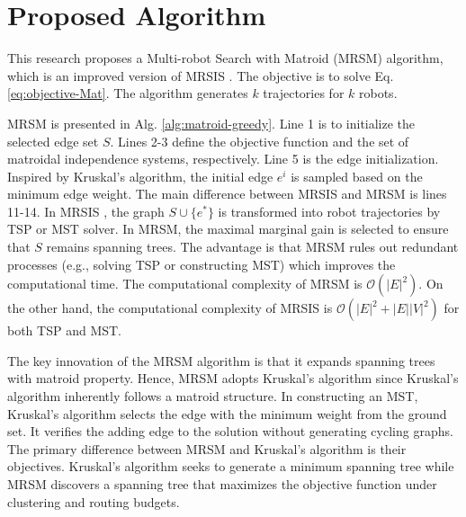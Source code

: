 \chapter{Proposed Algorithm}
This research proposes a Multi-robot Search with Matroid (MRSM) algorithm, which is an improved version of MRSIS \cite{li2024mrsis}.
The objective is to solve Eq. \eqref{eq:objective-Mat}. The algorithm generates $k$ trajectories for $k$ robots.

MRSM is presented in Alg. \ref{alg:matroid-greedy}.
Line 1 is to initialize the selected edge set $S$.
Lines 2-3 define the objective function and the set of matroidal independence systems, respectively.
Line 5 is the edge initialization. Inspired by Kruskal's algorithm, the initial edge $e^i$ is sampled based on the minimum edge weight.
The main difference between MRSIS \cite{li2024mrsis} and MRSM is lines 11-14.
In MRSIS \cite{li2024mrsis}, the graph $S \cup \{e^*\}$ is transformed into robot trajectories by TSP or MST solver.
In MRSM,  the maximal marginal gain is selected to ensure that $S$ remains spanning trees.
The advantage is that MRSM rules out redundant processes (e.g., solving TSP or constructing MST) which improves the computational time.
The computational complexity of MRSM is $\mathcal{O}(|E|^2)$. On the other hand, the computational complexity of MRSIS is $\mathcal{O}(|E|^2+|E||V|^2)$ for both TSP and MST.

The key innovation of the MRSM algorithm is that it expands spanning trees with matroid property.
Hence, MRSM adopts Kruskal's algorithm since Kruskal's algorithm inherently follows a matroid structure.
In constructing an MST, Kruskal's algorithm selects the edge with the minimum weight from the ground set.
It verifies the adding edge to the solution without generating cycling graphs.
The primary difference between MRSM and Kruskal's algorithm is their objectives.
Kruskal's algorithm seeks to generate a minimum spanning tree while
MRSM discovers a spanning tree that maximizes the objective function under clustering and routing budgets.

